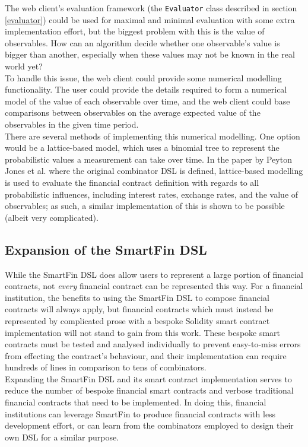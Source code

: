 The web client's evaluation framework (the \texttt{Evaluator} class described in section \ref{evaluator}) could be used for maximal and minimal evaluation with some extra implementation effort, but the biggest problem with this is the value of observables. How can an algorithm decide whether one observable's value is bigger than another, especially when these values may not be known in the real world yet? \\

To handle this issue, the web client could provide some numerical modelling functionality. The user could provide the details required to form a numerical model of the value of each observable over time, and the web client could base comparisons between observables on the average expected value of the observables in the given time period. \\

There are several methods of implementing this numerical modelling. One option would be a lattice-based model, which uses a binomial tree to represent the probabilistic values a measurement can take over time\cite{lattice-model}. In the paper by Peyton Jones et al.\cite{SPJ} where the original combinator DSL is defined, lattice-based modelling is used to evaluate the financial contract definition with regards to all probabilistic influences, including interest rates, exchange rates, and the value of observables; as such, a similar implementation of this is shown to be possible (albeit very complicated).


\subsection{Expansion of the SmartFin DSL}

While the SmartFin DSL does allow users to represent a large portion of financial contracts, not \textit{every} financial contract can be represented this way\cite{SPJ}. For a financial institution, the benefits to using the SmartFin DSL to compose financial contracts will always apply, but financial contracts which must instead be represented by complicated prose with a bespoke Solidity smart contract implementation will not stand to gain from this work. These bespoke smart contracts must be tested and analysed individually to prevent easy-to-miss errors from effecting the contract's behaviour, and their implementation can require hundreds of lines in comparison to tens of combinators. \\

Expanding the SmartFin DSL and its smart contract implementation serves to reduce the number of bespoke financial smart contracts and verbose traditional financial contracts that need to be implemented. In doing this, financial institutions can leverage SmartFin to produce financial contracts with less development effort, or can learn from the combinators employed to design their own DSL for a similar purpose. \\


